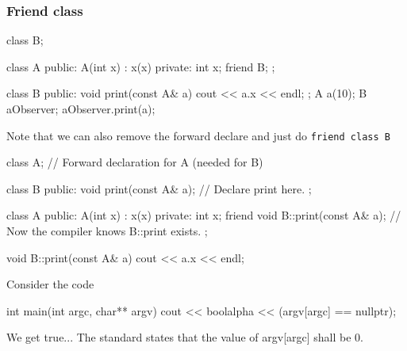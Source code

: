 \documentclass{report}
\begin{document}
\subsubsection{Friend class}
\bigbreak \noindent 
\begin{cppcode}
    class B;

    class A {
        public:
        A(int x) : x(x) {}
        private:
        int x{};
        friend B;
    };

    class B {
        public: 
        void print(const A& a) {
            cout << a.x << endl;
        }
    };
    A a(10);
    B aObserver{};
    aObserver.print(a);
\end{cppcode}
\bigbreak \noindent 
Note that we can also remove the forward declare and just do \texttt{friend class B}
\bigbreak \noindent 
\begin{cppcode}
    class A; // Forward declaration for A (needed for B)

    class B {
        public:
        void print(const A& a); // Declare print here.
    };

    class A {
        public:
        A(int x) : x(x) {}
        private:
        int x{};
        friend void B::print(const A& a);  // Now the compiler knows B::print exists.
    };

    void B::print(const A& a) {
        cout << a.x << endl;
    }
\end{cppcode}

\pagebreak 
{}
\bigbreak \noindent 
Consider the code
\bigbreak \noindent 
\begin{cppcode}
    int main(int argc, char** argv) {
        cout << boolalpha << (argv[argc] == nullptr);
    }
\end{cppcode}
\bigbreak \noindent 
We get true... The standard states that the value of argv[argc] shall be 0.

\pagebreak 
{}
\bigbreak \noindent 
\end{document}
